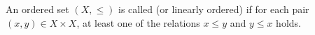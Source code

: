 An ordered set $(X, \leq)$ is called  (or linearly ordered) if for each pair $(x, y) \in X \times X$, at least one of the relations $x \leq y$ and $y \leq x$ holds.
